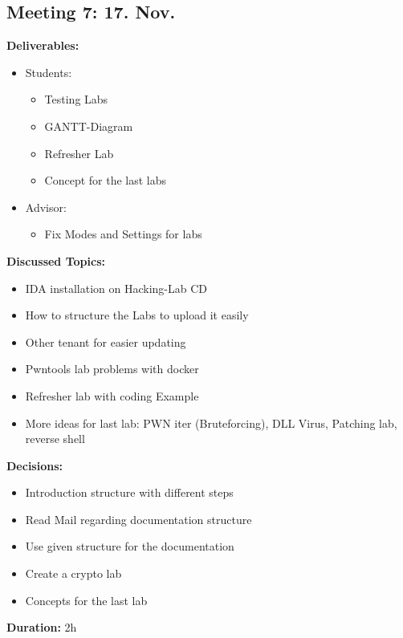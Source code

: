 \subsection*{Meeting 7: 17. Nov.}
\textbf{Deliverables:}
\begin{itemize}
    \item Students:
    \begin{itemize}
        \item Testing Labs
        \item GANTT-Diagram
        \item Refresher Lab
        \item Concept for the last labs
    \end{itemize}
    \item Advisor:
    \begin{itemize}
        \item Fix Modes and Settings for labs
    \end{itemize}
\end{itemize} 
\textbf{Discussed Topics:}
\begin{itemize}
    \item IDA installation on Hacking-Lab CD
    \item How to structure the Labs to upload it easily
    \item Other tenant for easier updating
    \item Pwntools lab problems with docker
    \item Refresher lab with coding Example
    \item More ideas for last lab: PWN iter (Bruteforcing), DLL Virus, Patching lab, reverse shell
\end{itemize}
\textbf{Decisions:}
\begin{itemize}
    \item Introduction structure with different steps
    \item Read Mail regarding documentation structure
    \item Use given structure for the documentation
    \item Create a crypto lab
    \item Concepts for the last lab
\end{itemize}
\textbf{Duration:} 2h
